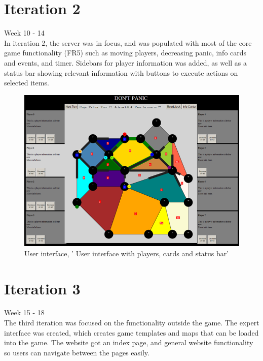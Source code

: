 \section{Iteration 2}

Week 10 - 14\\
\newline
In iteration 2, the server was in focus, and was populated with most of the core game functionality (FR5) such as moving players, decreasing panic, info cards and events, and timer. Sidebars for player information was added, as well as a status bar showing relevant information with buttons to execute actions on selected items.\\

\begin{figure}[H]
  \centering
    \includegraphics[width=1.0\textwidth]{img/earlyVersion.png}
  \caption{User interface, ' User interface with players, cards and status bar'} 
  \label{fig:earlyversion}
\end{figure}

\section{Iteration 3}

Week 15 - 18\\
\newline
The third iteration was focused on the functionality outside the game. The expert interface was created, which creates game templates and maps that can be loaded into the game. The website got an index page, and general website functionality so users can navigate between the pages easily.\\

